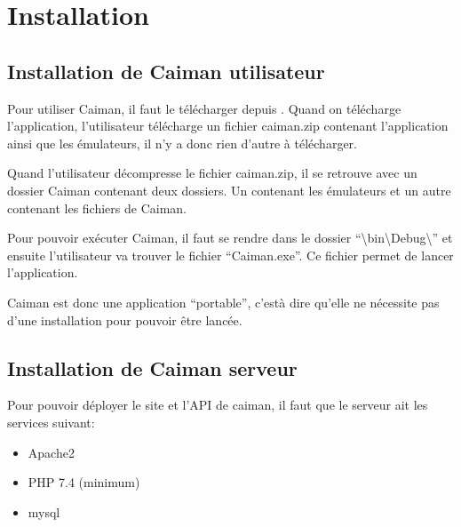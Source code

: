 \documentclass[a4paper,12pt,french]{sphinxmanual}
\begin{document}
\section{Installation}
\label{\detokenize{introduction:installation}}

\subsection{Installation de Caiman utilisateur}
\label{\detokenize{introduction:installation-de-caiman-utilisateur}}
\sphinxAtStartPar
Pour utiliser Caiman, il faut le télécharger depuis . Quand on télécharge l’application, l’utilisateur télécharge un fichier caiman.zip contenant l’application ainsi que les émulateurs, il n’y a donc rien d’autre à télécharger.

\sphinxAtStartPar
Quand l’utilisateur décompresse le fichier caiman.zip, il se retrouve avec un dossier Caiman contenant deux dossiers. Un contenant les émulateurs et un autre contenant les fichiers de Caiman.

\sphinxAtStartPar
{}

\sphinxAtStartPar
Pour pouvoir exécuter Caiman, il faut se rendre dans le dossier “\textbackslash{}bin\textbackslash{}Debug\textbackslash{}” et ensuite l’utilisateur va trouver le fichier “Caiman.exe”. Ce fichier permet de lancer l’application.

\sphinxAtStartPar
Caiman est donc une application “portable”, c’est\sphinxhyphen{}à\sphinxhyphen{} dire qu’elle ne nécessite pas d’une installation pour pouvoir être lancée.


\subsection{Installation de Caiman serveur}
\label{\detokenize{introduction:installation-de-caiman-serveur}}
\sphinxAtStartPar
Pour pouvoir déployer le site et l’API de caiman, il faut que le serveur ait les services suivant:
\begin{itemize}
\item {} 
\sphinxAtStartPar
Apache2

\item {} 
\sphinxAtStartPar
PHP 7.4 (minimum)

\item {} 
\sphinxAtStartPar
mysql

\end{itemize}
\end{document}
